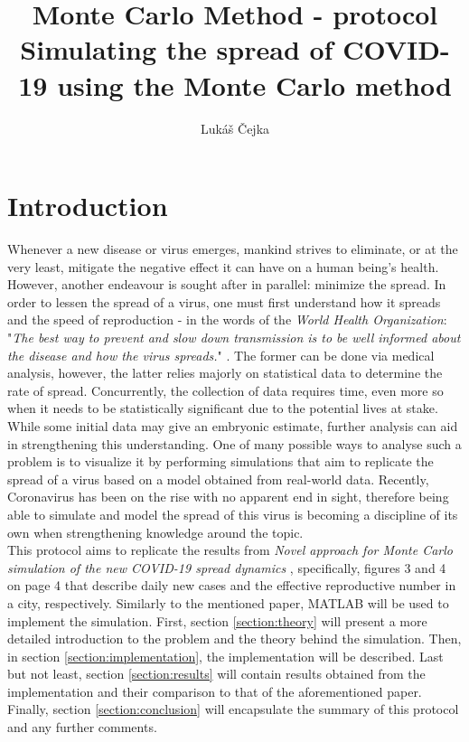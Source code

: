 \documentclass[a4paper]{article}
\newcommand{\code}{\texttt}
\newcommand{\Author}{Lukáš Čejka}
\begin{document}
\title{Monte Carlo Method - protocol \\
\textbf{Simulating the spread of COVID-19 using the Monte Carlo method}}
\author{\Author}
\maketitle

\renewcommand{\code}[1]{\colorbox{codegray}{\texttt{#1}}}

{
	\hypersetup{linkcolor=black}
	\tableofcontents
}


\section{Introduction}
Whenever a new disease or virus emerges, mankind strives to eliminate, or at the very least, mitigate the negative effect it can have on a human being's health. However, another endeavour is sought after in parallel: minimize the spread. In order to lessen the spread of a virus, one must first understand how it spreads and the speed of reproduction - in the words of the \textit{World Health Organization}: "\textit{The best way to prevent and slow down transmission is to be well informed about the disease and how the virus spreads.}" \cite{WHO2021}. The former can be done via medical analysis, however, the latter relies majorly on statistical data to determine the rate of spread. Concurrently, the collection of data requires time, even more so when it needs to be statistically significant due to the potential lives at stake. While some initial data may give an embryonic estimate, further analysis can aid in strengthening this understanding. One of many possible ways to analyse such a problem is to visualize it by performing simulations that aim to replicate the spread of a virus based on a model obtained from real-world data. Recently, Coronavirus has been on the rise with no apparent end in sight, therefore being able to simulate and model the spread of this virus is becoming a discipline of its own when strengthening knowledge around the topic. \\

This protocol aims to replicate the results from \textit{Novel approach for Monte Carlo simulation of the new COVID-19 spread dynamics} \cite{Maltezos2021}, specifically, figures 3 and 4 on page 4 that describe daily new cases and the effective reproductive number in a city, respectively. Similarly to the mentioned paper, MATLAB will be used to implement the simulation. First, section \ref{section:theory} will present a more detailed introduction to the problem and the theory behind the simulation. Then, in section \ref{section:implementation}, the implementation will be described. Last but not least, section \ref{section:results} will contain results obtained from the implementation and their comparison to that of the aforementioned paper. Finally, section \ref{section:conclusion} will encapsulate the summary of this protocol and any further comments.
\end{document}
